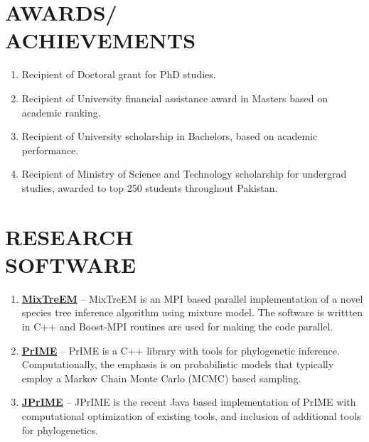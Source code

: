 \documentclass[margin, 10pt]{res} %
\begin{document}
\begin{resume}
\section{AWARDS/ \\ ACHIEVEMENTS} 

\begin{enumerate}
\item Recipient of Doctoral grant for PhD studies.
\item Recipient of University financial assistance award in Masters based on academic ranking.
\item Recipient of University scholarship in Bachelors, based on academic performance.
\item Recipient of Ministry of Science and Technology scholarship for undergrad studies, awarded to top 250 students throughout Pakistan.
\end{enumerate} 


\section{RESEARCH \\ SOFTWARE} 
\begin{enumerate}
\item \textbf{\href{http://prime.scilifelab.se/mixtreem/}{MixTreEM}} -- MixTreEM is an MPI based parallel implementation of a novel species tree inference algorithm using mixture model. The software is writtten in C++ and Boost-MPI routines are used for making the code parallel.
\item \textbf{\href{http://prime.scilifelab.se/}{PrIME}} -- PrIME is a C++ library with tools for phylogenetic inference. Computationally, the emphasis is on probabilistic models that typically employ a Markov Chain Monte Carlo (MCMC) based sampling.
\item \textbf{\href{https://code.google.com/p/jprime/}{JPrIME}} -- JPrIME is the recent Java based implementation of PrIME with computational optimization of existing tools, and inclusion of additional tools for phylogenetics.
\end{enumerate} 



\end{resume}
\end{document}

